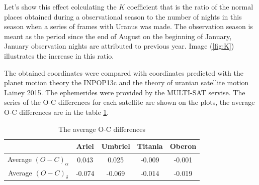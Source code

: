 \documentclass[]{article}
\begin{document}
Let's show this effect colculating the $K$ coefficient that is the ratio of the normal places obtained during a observational season to the number of nights in this season when a series of frames with Uranus was made. The observation season is meant as the period since the end of August on the beginning of January, January observation nights are attributed to previous year. Image (\ref{fig:K}) illustrates the increase in this ratio.\par


The obtained coordinates were compared with coordinates predicted with the planet motion theory the INPOP13c and the theory of uranian satellite motion Lainey 2015. The ephemerides were provided by the MULTI-SAT servise\cite{5}. The series of the O-C differences for each satellite are shown on the plots, the average O-C differences are in the table \ref{mean_OC}.

\begin{table}
\begin{center}
\caption{The average O-C differences}
\label{mean_OC}
\begin{tabular}{|c|c|c|c|c|}
\hline
& Ariel&Umbriel&Titania& Oberon \\
\hline
Average $(O-C)_\alpha$ & 0.043 & 0.025 & -0.009 & -0.001\\
Average $(O-C)_\delta$ & -0.074 & -0.069 & -0.014 & -0.019\\
\hline
\end{tabular}
\end{center}
\end{table}
\end{document}
